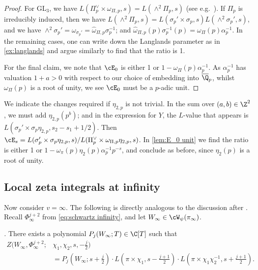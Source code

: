 \documentclass[10pt,reqno,a4paper]{amsart}
\newcommand{\GL}{\mathrm{GL}}
\begin{document}


\begin{proof}
	For $\GL_3$, we have $L(\Pi_p^\vee\times \omega_{\Pi,p},s) = L(\wedge^2 \Pi_p , s)$ (see e.g.\ \cite[\S1]{Kim03}). If $\Pi_p$ is irreducibly induced, then we have $L(\wedge^2 \Pi_p, s) = L(\sigma_p' \times \sigma_p, s) L(\wedge^2 \sigma_p', s)$, and we have $\wedge^2 \sigma_p' = \omega_{\sigma_p'} = \widehat{\omega}_{\Pi,p} \sigma_p^{-1}$; and $\widehat{\omega}_{\Pi,p}(p)\sigma_p^{-1}(p) = \omega_{\Pi}(p)\alpha_p^{-1}$. In the remaining cases, one can write down the Langlands parameter as in \cref{ex:langlands} and argue similarly to find that the ratio is 1.

 For the final claim, we note that $\cE_0$ is either 1 or $1 -  \omega_{\Pi}(p)\alpha_p^{-1}$. As $\alpha_p^{-1}$ has valuation $1 + a > 0$ with respect to our choice of embedding into $\overline{\Q}_p$, whilst $\omega_{\Pi}(p)$ is a root of unity, we see $\cE_0$ must be a $p$-adic unit.
\end{proof}


\begin{remark}\label{rem:non-trivial eta}
	We indicate the changes required if $\eta_{2,p}$ is not trivial. In the sum over $(a,b)\in\Z^2$, we must add $\eta_{2,p}(p^b)$; and in the expression for $Y$, the $L$-value that appears is $L(\sigma_p'\times\sigma_p\eta_{2,p},s_2-s_1+1/2)$. Then $\cE_s = L(\sigma_p'\times\sigma_p\eta_{2,p},s)/L(\Pi_p^\vee\times\omega_{\Pi,p}\eta_{2,p},s)$. In \cref{lem:E_0 unit} we find the ratio is either 1 or $1-\omega_\pi(p)\eta_2(p)\alpha_p^{-1}p^{-s}$, and conclude as before, since $\eta_2(p)$ is a root of unity.
\end{remark}



\subsection{Local zeta integrals at infinity}
Now consider $v=\infty$. The following is directly analogous to the discussion after \cite[Lem.\ 1.1]{Mah00}.  Recall $\Phi_\infty^{j+2}$ from \eqref{eq:schwartz infinity}, and let $W_\infty \in \cW_\psi(\pi_\infty)$.

\begin{lemma}\emph{\cite{JPSS-L-factors}.} \label{lem:local zeta infty}
There exists a polynomial $P_j(W_\infty; T) \in \C[T]$ such that
\begin{align*}
	Z(W_\infty,\Phi_\infty^{j+2}; &\chi_1,\chi_2,s,-\tfrac{j}{2})  \\
	&= P_j(W_\infty; s +\tfrac{j}{2}) \cdot  L(\pi \times \chi_1, s - \tfrac{j + 1}{2})\cdot  L(\pi \times \chi_1\chi_2^{-1}, s+\tfrac{j + 1}{2}).
\end{align*}
\end{lemma}
\end{document}
